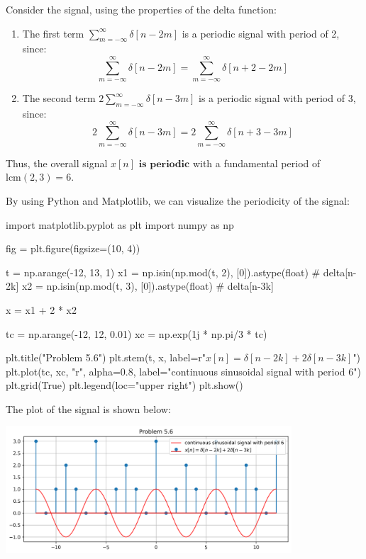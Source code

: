\documentclass[a4paper, 10pt]{article}
\begin{document}
\begin{solution}
Consider the signal, using the properties of the delta function:

\begin{enumerate}
    \item The first term \( \sum_{m=-\infty}^{\infty} \delta[n-2m] \) is a periodic signal with period of 2, since:
    \[
        \sum_{m=-\infty}^{\infty} \delta[n-2m] = \sum_{m=-\infty}^{\infty} \delta[n+2-2m]
    \]
    \item The second term \( 2\sum_{m=-\infty}^{\infty} \delta[n-3m] \) is a periodic signal with period of 3, since:
    \[
        2\sum_{m=-\infty}^{\infty} \delta[n-3m] = 2\sum_{m=-\infty}^{\infty} \delta[n+3-3m]
    \]
\end{enumerate}
Thus, the overall signal \( x[n] \) \( \boxed{\textbf{is periodic}} \) with a fundamental period of \( \text{lcm}(2, 3) = \boxed{6} \).

\vspace{5mm}

By using Python and Matplotlib, we can visualize the periodicity of the signal:
\begin{codingbox}
import matplotlib.pyplot as plt
import numpy as np

fig = plt.figure(figsize=(10, 4))

t = np.arange(-12, 13, 1)
x1 = np.isin(np.mod(t, 2), [0]).astype(float) # delta[n-2k]
x2 = np.isin(np.mod(t, 3), [0]).astype(float) # delta[n-3k]

x = x1 + 2 * x2

tc = np.arange(-12, 12, 0.01)
xc = np.exp(1j * np.pi/3 * tc)

plt.title("Problem 5.6")
plt.stem(t, x, label=r"$x[n] = \delta[n-2k] + 2\delta[n-3k]$")
plt.plot(tc, xc, "r", alpha=0.8, label="continuous sinusoidal signal with period 6")
plt.grid(True)
plt.legend(loc="upper right")
plt.show()
\end{codingbox}

The plot of the signal is shown below:
\begin{center}
    \includegraphics[width=0.8\textwidth]{images/problem_5_6.png}
\end{center}
\end{solution}
\end{document}

